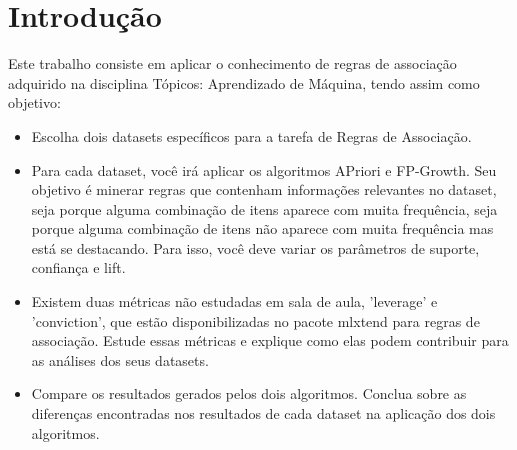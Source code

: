 \chapter{Introdução}\label{cap_intro}

Este trabalho consiste em aplicar o conhecimento de regras de associação adquirido na disciplina Tópicos: Aprendizado de Máquina, tendo assim como objetivo:

\begin{itemize}
\item Escolha dois datasets específicos para a tarefa de Regras de Associação.

\item Para cada dataset, você irá aplicar os algoritmos APriori e FP-Growth. Seu objetivo é minerar regras que contenham informações relevantes no dataset, seja porque alguma combinação de itens aparece com muita frequência, seja porque alguma combinação de itens não aparece com muita frequência mas está se destacando. Para isso, você deve variar os parâmetros de suporte, confiança e lift.

\item Existem duas métricas não estudadas em sala de aula, 'leverage' e 'conviction', que estão disponibilizadas no pacote mlxtend para regras de associação. Estude essas métricas e explique como elas podem contribuir para as análises dos seus datasets.

\item Compare os resultados gerados pelos dois algoritmos. Conclua sobre as diferenças encontradas nos resultados de cada dataset na aplicação dos dois algoritmos.
\end{itemize}
